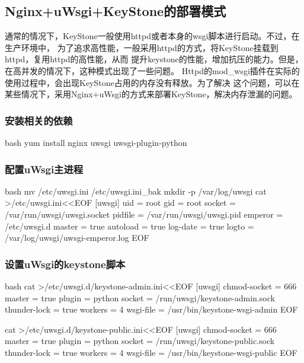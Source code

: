 \subsection{Nginx+uWsgi+KeyStone的部署模式}

通常的情况下，KeyStone一般使用httpd或者本身的wsgi脚本进行启动。不过，在生产环境中，
为了追求高性能，一般采用httpd的方式，将KeyStone挂载到httpd，复用httpd的高性能，从而
提升keystone的性能，增加抗压的能力。但是，在高并发的情况下，这种模式出现了一些问题。
Httpd的mod\_wsgi插件在实际的使用过程中，会出现KeyStone占用的内存没有释放。为了解决
这个问题，可以在某些情况下，采用Nginx+uWsgi的方式来部署KeyStone，解决内存泄漏的问题。

\subsubsection{安装相关的依赖}
\begin{code-block}{bash}
yum install nginx uwsgi uwsgi-plugin-python
\end{code-block}

\subsubsection{配置uWsgi主进程}
\begin{code-block}{bash}
mv /etc/uwsgi.ini /etc/uwsgi.ini_bak
mkdir -p /var/log/uwsgi
cat >/etc/uwsgi.ini<<EOF
[uwsgi]
uid = root
gid = root
socket = /var/run/uwsgi/uwsgi.socket
pidfile = /var/run/uwsgi/uwsgi.pid
emperor = /etc/uwsgi.d
master = true
autoload = true
log-date = true
logto = /var/log/uwsgi/uwsgi-emperor.log
EOF
\end{code-block}

\subsubsection{设置uWsgi的keystone脚本}
\begin{code-block}{bash}
cat >/etc/uwsgi.d/keystone-admin.ini<<EOF
[uwsgi]
chmod-socket = 666
master = true
plugin = python
socket = /run/uwsgi/keystone-admin.sock
thunder-lock = true
workers = 4
wsgi-file = /usr/bin/keystone-wsgi-admin
EOF

cat >/etc/uwsgi.d/keystone-public.ini<<EOF
[uwsgi]
chmod-socket = 666
master = true
plugin = python
socket = /run/uwsgi/keystone-public.sock
thunder-lock = true
workers = 4
wsgi-file = /usr/bin/keystone-wsgi-public
EOF
\end{code-block}

